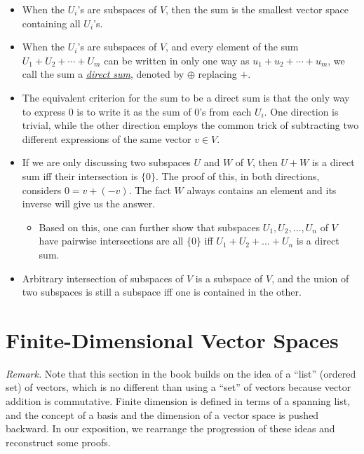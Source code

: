 \documentclass[11pt]{article}
\newcommand{\df}[1]{\ul{\textit{\textsf{#1}}}}
\begin{document}
\begin{itemize}
    \item When the $U_i$'s are subspaces of $V$, then the sum is the smallest vector space containing all $U_i$'s.
    \item When the $U_i$'s are subspaces of $V$, and every element of the sum $U_1 + U_2 +\cdots+ U_m$ can be written in only one way as $u_1+u_2+\cdots+u_m$, we call the sum a \df{direct sum}, denoted by $\oplus$ replacing $+$.
    \item The equivalent criterion for the sum to be a direct sum is that the only way to express $0$ is to write it as the sum of $0$'s from each $U_i$. One direction is trivial, while the other direction employs the common trick of subtracting two different expressions of the same vector $v \in V$.
    \item If we are only discussing two subspaces $U$ and $W$ of $V$, then $U+W$ is a direct sum iff their intersection is $\{0\}$. The proof of this, in both directions, considers $0 = v + (-v)$. The fact $W$ always contains an element and its inverse will give us the answer.
    \begin{itemize}
    	\item Based on this, one can further show that subspaces $U_1,U_2,\dots,U_n$ of $V$ have pairwise intersections are all $\{0\}$ iff $U_1 + U_2 + \dots + U_n$ is a direct sum.
    \end{itemize}
    \item Arbitrary intersection of subspaces of $V$ is a subspace of $V$, and the union of two subspaces is still a subspace iff one is contained in the other.
\end{itemize}


\newpage
\section{Finite-Dimensional Vector Spaces}

\textit{Remark.} Note that this section in the book builds on the idea of a ``list'' (ordered set) of vectors, which is no different than using a ``set'' of vectors because vector addition is commutative. Finite dimension is defined in terms of a spanning list, and the concept of a basis and the dimension of a vector space is pushed backward. In our exposition, we rearrange the progression of these ideas and reconstruct some proofs.
\end{document}
